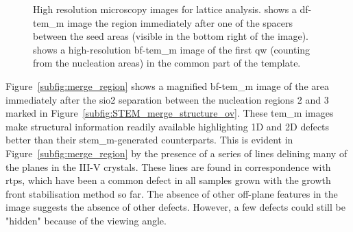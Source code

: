 \begin{figure}
    \centering
    \caption{High resolution microscopy images for lattice analysis.  shows a \acs{df}-\acs{tem_m} image the region immediately after one of the spacers between the seed areas (visible in the bottom right of the image).  shows a high-resolution \acs{bf}-\acs{tem_m} image of the first \acl{qw} (counting from the nucleation areas) in the common part of the template.}
    \label{fig:merge_high-res}
\end{figure}

Figure~\ref{subfig:merge_region} shows a magnified \acs{bf}-\acs{tem_m} image of the area immediately after the \acs{sio2} separation between the nucleation regions 2 and 3 marked in Figure~\ref{subfig:STEM_merge_structure_ov}. These \acs{tem_m} images make structural information readily available highlighting 1D and 2D defects better than their \acs{stem_m}-generated counterparts. This is evident in Figure~\ref{subfig:merge_region} by the presence of a series of lines delining many of the  planes in the III-V crystals. These lines are found in correspondence with \acs{rtp}s, which have been a common defect in all samples grown with the  growth front stabilisation method so far. The absence of other off-plane features in the image suggests the absence of other defects. However, a few defects could still be "hidden" because of the viewing angle.

